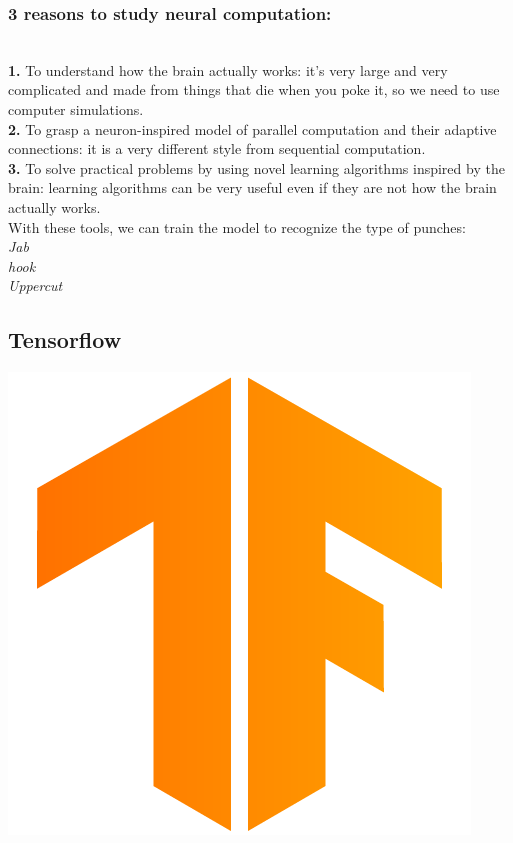 \documentclass[a4paper,12pt]{report}
\begin{document}
\subsubsection{3 reasons to study neural computation:}\\
\textbf{1.} To understand how the brain actually works: it's very large and very complicated and made from things that die when you poke it, so we need to use computer simulations.\\
\textbf{2.} To grasp a neuron-inspired model of parallel computation and their adaptive connections: it is a very different style from sequential computation.\\
\textbf{3.} To solve practical problems by using novel learning algorithms inspired by the brain: learning algorithms can be very useful even if they are not how the brain actually works.
\\
With these tools, we can train the model to recognize the type of punches:\\
\textit{Jab\\hook\\Uppercut}
\subsection{Tensorflow}
\includegraphics[scale=.04]{images/tensorflow.png}
\end{document}
